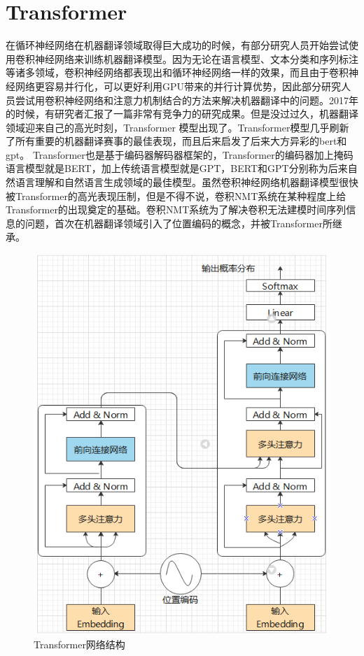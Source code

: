 \documentclass[twoside,a4paper,12pt]{book}%
\begin{document}
\section{Transformer}
在循环神经网络在机器翻译领域取得巨大成功的时候，有部分研究人员开始尝试使用卷积神经网络来训练机器翻译模型。因为无论在语言模型、文本分类和序列标注等诸多领域，卷积神经网络都表现出和循环神经网络一样的效果，而且由于卷积神经网络更容易并行化，可以更好利用GPU带来的并行计算优势，因此部分研究人员尝试用卷积神经网络和注意力机制结合的方法来解决机器翻译中的问题。2017年的时候，有研究者汇报了一篇非常有竞争力的研究成果。但是没过过久，机器翻译领域迎来自己的高光时刻，Transformer 模型出现了。Transformer模型几乎刷新了所有重要的机器翻译赛事的最佳表现，而且后来启发了后来大方异彩的bert和gpt。
Transformer也是基于编码器解码器框架的，Transformer的编码器加上掩码语言模型就是\gls{BERT}，加上传统语言模型就是\gls{GPT}，\gls{BERT}和\gls{GPT}分别称为后来自然语言理解和自然语言生成领域的最佳模型。虽然卷积神经网络机器翻译模型很快被Transformer的高光表现压制，但是不得不说，卷积\gls{NMT}系统在某种程度上给Transformer的出现奠定的基础。卷积\gls{NMT}系统为了解决卷积无法建模时间序列信息的问题，首次在机器翻译领域引入了位置编码的概念，并被Transformer所继承。
\begin{figure}[htbp]
\begin{center}
\includegraphics[width=5.0in]{figures/transformer2.png}
\caption{Transformer网络结构}
\label{fig:transformer2}
\end{center}
\end{figure}
\end{document}
